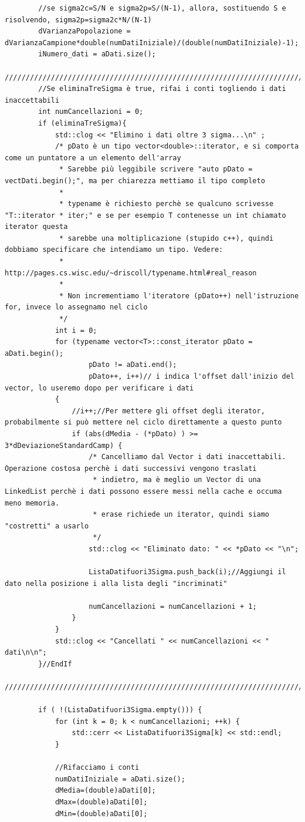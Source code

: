 \documentclass[12pt]{article} %
\begin{document}
\begin{verbatim}
		//se sigma2c=S/N e sigma2p=S/(N-1), allora, sostituendo S e risolvendo, sigma2p=sigma2c*N/(N-1)
		dVarianzaPopolazione = dVarianzaCampione*double(numDatiIniziale)/(double(numDatiIniziale)-1);
		iNumero_dati = aDati.size();
		////////////////////////////////////////////////////////////////////////////////////////////////////
		//Se eliminaTreSigma è true, rifai i conti togliendo i dati inaccettabili
		int numCancellazioni = 0;
		if (eliminaTreSigma){
			std::clog << "Elimino i dati oltre 3 sigma...\n" ;
			/* pDato è un tipo vector<double>::iterator, e si comporta come un puntatore a un elemento dell'array
			 * Sarebbe più leggibile scrivere "auto pDato = vectDati.begin();", ma per chiarezza mettiamo il tipo completo
			 *
			 * typename è richiesto perchè se qualcuno scrivesse "T::iterator * iter;" e se per esempio T contenesse un int chiamato iterator questa
			 * sarebbe una moltiplicazione (stupido c++), quindi dobbiamo specificare che intendiamo un tipo. Vedere:
			 * http://pages.cs.wisc.edu/~driscoll/typename.html#real_reason
			 *
			 * Non incrementiamo l'iteratore (pDato++) nell'istruzione for, invece lo assegnamo nel ciclo
			 */
			int i = 0;
			for (typename vector<T>::const_iterator pDato = aDati.begin();
					pDato != aDati.end();
					pDato++, i++)// i indica l'offset dall'inizio del vector, lo useremo dopo per verificare i dati
			{
				//i++;//Per mettere gli offset degli iterator, probabilmente si può mettere nel ciclo direttamente a questo punto
				if (abs(dMedia - (*pDato) ) >= 3*dDeviazioneStandardCamp) {
					/* Cancelliamo dal Vector i dati inaccettabili. Operazione costosa perchè i dati successivi vengono traslati
					 * indietro, ma è meglio un Vector di una LinkedList perchè i dati possono essere messi nella cache e occuma meno memoria.
					 * erase richiede un iterator, quindi siamo "costretti" a usarlo
					 */
					std::clog << "Eliminato dato: " << *pDato << "\n";

					ListaDatifuori3Sigma.push_back(i);//Aggiungi il dato nella posizione i alla lista degli "incriminati"

					numCancellazioni = numCancellazioni + 1;
				}
			}
			std::clog << "Cancellati " << numCancellazioni << " dati\n\n";
		}//EndIf
		////////////////////////////////////////////////////////////////////////////////////////////////////

		if ( !(ListaDatifuori3Sigma.empty())) {
			for (int k = 0; k < numCancellazioni; ++k) {
				std::cerr << ListaDatifuori3Sigma[k] << std::endl;
			}

			//Rifacciamo i conti
			numDatiIniziale = aDati.size();
			dMedia=(double)aDati[0];
			dMax=(double)aDati[0];
			dMin=(double)aDati[0];


\end{verbatim}
\end{document}
